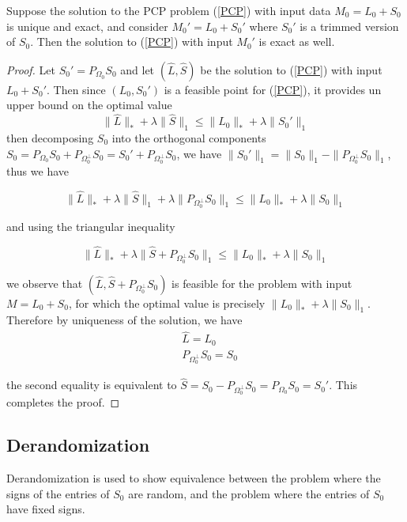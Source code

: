 \documentclass{../common/projectreport}
\begin{document}
\begin{theorem}
Suppose the solution to the PCP problem (\ref{PCP}) with input data $M_0 = L_0 + S_0$ is unique and exact, and consider $M_0' = L_0 + S_0'$ where $S_0'$ is a trimmed version of $S_0$. Then the solution to (\ref{PCP}) with input $M_0'$ is exact as well.
\end{theorem}

\begin{proof}
Let $S_0' = P_{\Omega_0} S_0$ and let $(\hat{L}, \hat{S})$ be the solution to (\ref{PCP}) with input $L_0 + S_0'$. Then since $(L_0, S_0')$ is a feasible point for (\ref{PCP}), it provides un upper bound on the optimal value
\[
\|\hat{L}\|_* + \lambda \|\hat{S}\|_1 \leq \|L_0\|_* + \lambda \|S_0'\|_1
\]
then decomposing $S_0$ into the orthogonal components $S_0 = P_{\Omega_0} S_0 + P_{\Omega_0^\perp} S_0 = S_0' + P_{\Omega_0^\perp} S_0$, we have $\|S_0'\|_1 = \|S_0\|_1 - \|P_{\Omega_0^\perp} S_0\|_1$, thus we have

\[
\|\hat{L}\|_* + \lambda \|\hat{S}\|_1 + \lambda \|P_{\Omega_0^\perp} S_0\|_1 \leq \|L_0\|_* + \lambda \|S_0\|_1
\]

and using the triangular inequality

\[
\|\hat{L}\|_* + \lambda \|\hat{S} + P_{\Omega_0^\perp} S_0\|_1 \leq \|L_0\|_* + \lambda \|S_0\|_1
\]

we observe that $(\hat{L}, \hat{S} + P_{\Omega_0^\perp} S_0)$ is feasible for the problem with input $M = L_0 + S_0$, for which the optimal value is precisely $\|L_0\|_* + \lambda \|S_0\|_1$. Therefore by uniqueness of the solution, we have
\[
\begin{aligned}
&\hat{L} = L_0 \\
&P_{\Omega_0^\perp} S_0 = S_0
\end{aligned}
\]

the second equality is equivalent to $\hat{S} = S_0 - P_{\Omega_0^\perp} S_0 = P_{\Omega_0} S_0 = S_0'$. This completes the proof.
\end{proof}


\subsection{Derandomization}
Derandomization is used to show equivalence between the problem where the signs of the entries of $S_0$ are random, and the problem where the entries of $S_0$ have fixed signs.
\end{document}
